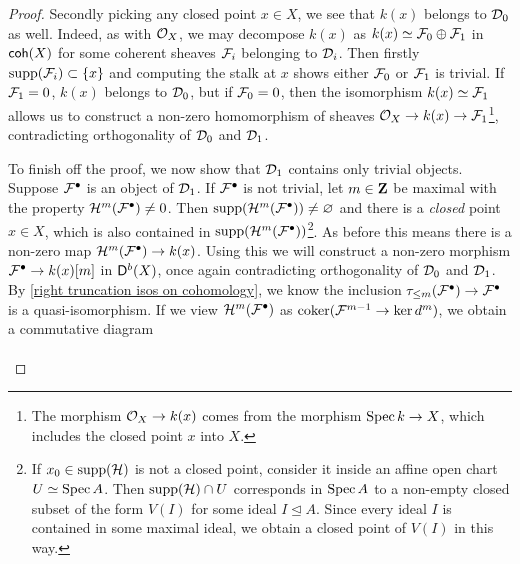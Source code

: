 \begin{proof}
    Secondly picking any closed point $x \in X$, we see that $k(x)$ belongs to $\mathcal D_0$ as well. Indeed, as with ${\mathcal{O}_{X}}$, we may decompose $k(x)$ as $k(x) \simeq \mathcal F_0 \oplus \mathcal F_1$ in $\mathsf{coh}(X)$ for some coherent sheaves $\mathcal F_i$ belonging to $\mathcal D_i$. Then firstly $\operatorname{supp}(\mathcal F_i) \subset \{x\}$ and computing the stalk at $x$ shows either $\mathcal F_0$ or $\mathcal F_1$ is trivial. If $\mathcal F_1 = 0$, $k(x)$ belongs to $\mathcal D_0$, but if $\mathcal F_0 = 0$, then the isomorphism $k(x) \simeq \mathcal F_1$ allows us to construct a non-zero homomorphism of sheaves ${\mathcal{O}_{X}} \to k(x) \to \mathcal F_1$\footnote{The morphism ${\mathcal{O}_{X}} \to k(x)$ comes from the morphism $\operatorname{Spec}k \to X$, which includes the closed point $x$ into $X$.}, contradicting orthogonality of $\mathcal D_0$ and $\mathcal D_1$.

    To finish off the proof, we now show that $\mathcal D_1$ contains only trivial objects. Suppose $\mathcal F^\bullet$ is an object of $\mathcal D_1$. If $\mathcal F^\bullet$ is not trivial, let $m \in \mathbf Z$ be maximal with the property $\mathcal H^m(\mathcal F^\bullet) \neq 0$. Then $\operatorname{supp}(\mathcal H^m(\mathcal F^\bullet)) \neq \varnothing$ and there is a \emph{closed} point $x \in X$, which is also contained in $\operatorname{supp}(\mathcal H^m(\mathcal F^\bullet))$\footnote{
        If $x_0 \in \operatorname{supp}(\mathcal H)$ is not a closed point, consider it inside an affine open chart $U \simeq \operatorname{Spec}A$. Then $\operatorname{supp}(\mathcal H) \cap U$ corresponds in $\operatorname{Spec}A$ to a non-empty closed subset of the form $V(I)$ for some ideal $I \trianglelefteq A$. Since every ideal $I$ is contained in some maximal ideal, we obtain a closed point of $V(I)$ in this way.
    }. As before this means there is a non-zero map $\mathcal H^m(\mathcal F^\bullet) \to k(x)$. Using this we will construct a non-zero morphism $\mathcal F^\bullet \to k(x)[m]$ in $\mathsf{D}^b(X)$, once again contradicting orthogonality of $\mathcal D_0$ and $\mathcal D_1$. By \eqref{right truncation isos on cohomology}, we know the inclusion $\tau_{\leq m}(\mathcal F^\bullet) \to \mathcal F^\bullet$ is a quasi-isomorphism. If we view $\mathcal H^m(\mathcal F^\bullet)$ 
    as $\operatorname{coker}(\mathcal F^{m-1} \to \ker d^m)$, we obtain a commutative diagram
    \[\begin{tikzcd}[row sep = small, column sep = small]

\end{tikzcd}\]
\end{proof}
